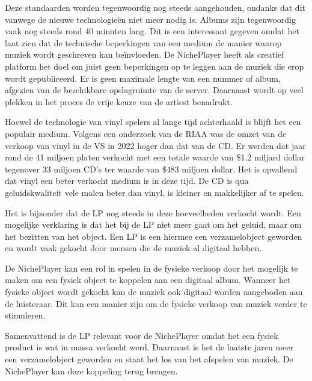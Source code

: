 Deze standaarden worden tegenwoordig nog steeds aangehouden, ondanks dat dit vanwege de nieuwe technologieën niet meer nodig is. Albums zijn tegenwoordig vaak nog steeds rond 40 minuten lang. Dit is een interessant gegeven omdat het laat zien dat de technische beperkingen van een medium de manier waarop muziek wordt geschreven kan beïnvloeden. De NichePlayer heeft als creatief platform het doel om juist geen beperkingen op te leggen aan de muziek die erop wordt gepubliceerd. Er is geen maximale lengte van een nummer of album, afgezien van de beschikbare opslagruimte van de server. Daarnaast wordt op veel plekken in het proces de vrije keuze van de artiest benadrukt.

Hoewel de technologie van vinyl spelers al lange tijd achterhaald is blijft het een populair medium. Volgens een onderzoek van de RIAA \citep{year_end_2022_RIAA_revenue_statistics} was de omzet van de verkoop van vinyl in de VS in 2022 hoger dan dat van de CD. Er werden dat jaar rond de 41 miljoen platen verkocht met een totale waarde van \$1.2 miljard dollar tegenover 33 miljoen CD's ter waarde van \$483 miljoen dollar. Het is opvallend dat vinyl een beter verkocht medium is in deze tijd. De CD is qua geluidskwaliteit vele malen beter dan vinyl, is kleiner en makkelijker af te spelen.

Het is bijzonder dat de LP nog steeds in deze hoeveelheden verkocht wordt. Een mogelijke verklaring is dat het bij de LP niet meer gaat om het geluid, maar om het bezitten van het object. Een LP is een hiermee een verzamelobject geworden en wordt vaak gekocht door mensen die de muziek al digitaal hebben.

De NichePlayer kan een rol in spelen in de fysieke verkoop door het mogelijk te maken om een fysiek object te koppelen aan een digitaal album. Wanneer het fysieke object wordt gekocht kan de muziek ook digitaal worden aangeboden aan de luisteraar. Dit kan een manier zijn om de fysieke verkoop van muziek verder te stimuleren.

Samenvattend is de LP relevant voor de NichePlayer omdat het een fysiek product is wat in massa verkocht werd. Daarnaast is het de laatste jaren meer een verzamelobject geworden en staat het los van het afspelen van muziek. De NichePlayer kan deze koppeling terug brengen.

